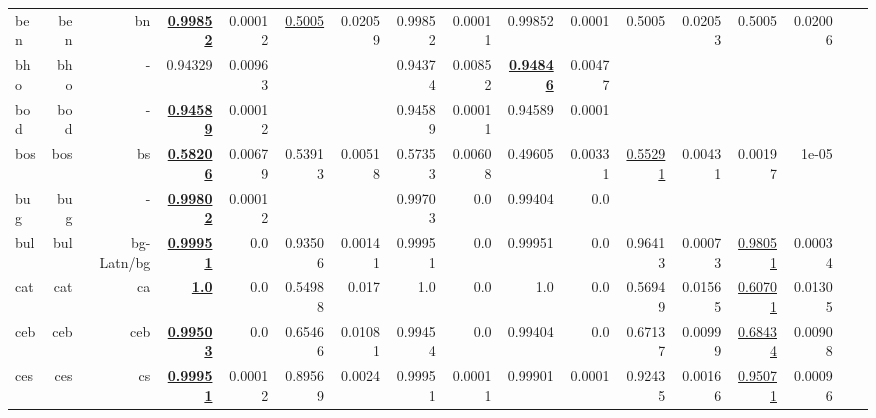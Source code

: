 \documentclass[11pt]{article}
\begin{document}
\begin{table*}[h]
{\begin{tabular}{lrrrrrrrrrrrrrrrr}
ben         & ben         & bn         & \textbf{\underline{0.99852}}         & 0.00012         & \underline{0.5005}         & 0.02059         & 0.99852         & 0.00011         & 0.99852         & 0.0001         & 0.5005         & 0.02053         & 0.5005         & 0.02006         \\
bho         & bho         & -         & 0.94329         & 0.00963         &          &          & 0.94374         & 0.00852         & \textbf{\underline{0.94846}}         & 0.00477         &          &          &          &          \\
bod         & bod         & -         & \textbf{\underline{0.94589}}         & 0.00012         &          &          & 0.94589         & 0.00011         & 0.94589         & 0.0001         &          &          &          &          \\
bos         & bos         & bs         & \textbf{\underline{0.58206}}         & 0.00679         & 0.53913         & 0.00518         & 0.57353         & 0.00608         & 0.49605         & 0.00331         & \underline{0.55291}         & 0.00431         & 0.00197         & 1e-05         \\
bug         & bug         & -         & \textbf{\underline{0.99802}}         & 0.00012         &          &          & 0.99703         & 0.0         & 0.99404         & 0.0         &          &          &          &          \\
bul         & bul         & bg-Latn/bg         & \textbf{\underline{0.99951}}         & 0.0         & 0.93506         & 0.00141         & 0.99951         & 0.0         & 0.99951         & 0.0         & 0.96413         & 0.00073         & \underline{0.98051}         & 0.00034         \\
cat         & cat         & ca         & \textbf{\underline{1.0}}         & 0.0         & 0.54988         & 0.017         & 1.0         & 0.0         & 1.0         & 0.0         & 0.56949         & 0.01565         & \underline{0.60701}         & 0.01305         \\
ceb         & ceb         & ceb         & \textbf{\underline{0.99503}}         & 0.0         & 0.65466         & 0.01081         & 0.99454         & 0.0         & 0.99404         & 0.0         & 0.67137         & 0.00999         & \underline{0.68434}         & 0.00908         \\
ces         & ces         & cs         & \textbf{\underline{0.99951}}         & 0.00012         & 0.89569         & 0.0024         & 0.99951         & 0.00011         & 0.99901         & 0.0001         & 0.92435         & 0.00166         & \underline{0.95071}         & 0.00096         \\

\end{tabular}}
\end{table*}
\end{document}

